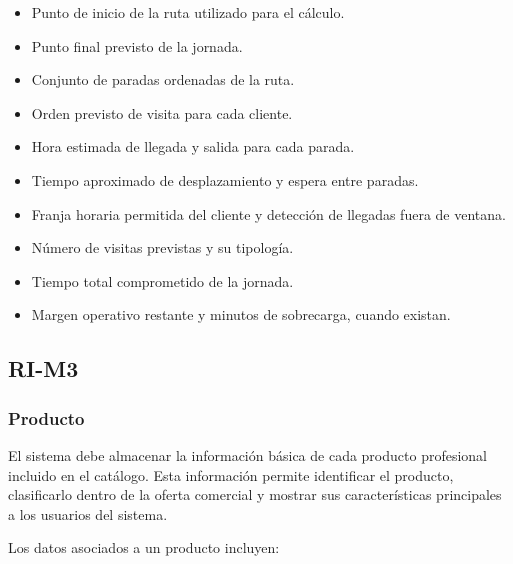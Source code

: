 \begin{itemize}
    \item Punto de inicio de la ruta utilizado para el cálculo.
    \item Punto final previsto de la jornada.
    \item Conjunto de paradas ordenadas de la ruta.
    \item Orden previsto de visita para cada cliente.
    \item Hora estimada de llegada y salida para cada parada.
    \item Tiempo aproximado de desplazamiento y espera entre paradas.
    \item Franja horaria permitida del cliente y detección de llegadas fuera de ventana.
    \item Número de visitas previstas y su tipología.
    \item Tiempo total comprometido de la jornada.
    \item Margen operativo restante y minutos de sobrecarga, cuando existan.
\end{itemize}

\subsection{RI-M3}

\subsubsection*{Producto}

El sistema debe almacenar la información básica de cada producto profesional incluido en el catálogo. Esta información permite identificar el producto, clasificarlo dentro de la oferta comercial y mostrar sus características principales a los usuarios del sistema.

Los datos asociados a un producto incluyen:

